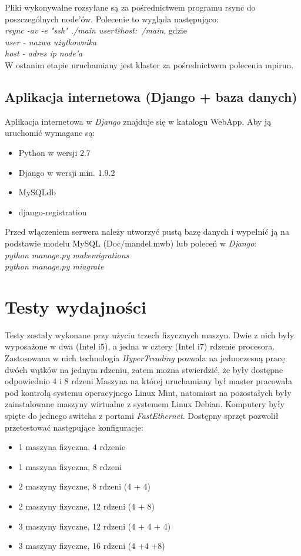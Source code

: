 \documentclass[a4paper]{article}
\begin{document}
Pliki wykonywalne rozsyłane są za pośrednictwem programu rsync do poszczególnych node'ów. Polecenie to wygląda następująco:\\
\textit{rsync -av -e "ssh" ./main user@host:~/main}, gdzie\\
\textit{user - nazwa użytkownika\\
host - adres ip node'a}\\
W ostanim etapie uruchamiany jest klaster za pośrednictwem polecenia mpirun.

\newpage

\subsection{Aplikacja internetowa (Django + baza danych)}
Aplikacja internetowa w \textit{Django} znajduje się w katalogu WebApp. Aby ją uruchomić wymagane są:
\begin{itemize}
\item Python w wersji 2.7
\item Django w wersji min. 1.9.2
\item MySQLdb
\item django-registration
\end{itemize}
Przed włączeniem serwera należy utworzyć pustą bazę danych i wypełnić ją na podstawie modelu MySQL (Doc/mandel.mwb) lub poleceń w \textit{Django}:\\
\textit{python manage.py makemigrations\\
python manage.py miagrate}

\section{Testy wydajności}
Testy zostały wykonane przy użyciu trzech fizycznych maszyn. Dwie z nich były wyposażone w dwa (Intel i5), a jedna w cztery (Intel i7) rdzenie procesora. Zastosowana w nich technologia \textit{HyperTreading} pozwala na jednoczesną pracę dwóch wątków na jednym rdzeniu, zatem można stwierdzić, że były dostępne odpowiednio 4 i 8 rdzeni Maszyna na której uruchamiany był master pracowała pod kontrolą systemu operacyjnego Linux Mint, natomiast na pozostałych były zainstalowane maszyny wirtualne z systemem Linux Debian. Komputery były spięte do jednego switcha z portami \textit{FastEthernet}. Dostępny sprzęt pozwolił przetestować następujące konfiguracje:
\begin{itemize}
\item 1 maszyna fizyczna, 4 rdzenie
\item 1 maszyna fizyczna, 8 rdzeni
\item 2 maszyny fizyczne, 8 rdzeni (4 + 4)
\item 2 maszyny fizyczne, 12 rdzeni (4 + 8)
\item 3 maszyny fizyczne, 12 rdzeni (4 + 4 + 4)
\item 3 maszyny fizyczne, 16 rdzeni (4 +4 +8)
\end{itemize}
\end{document}
